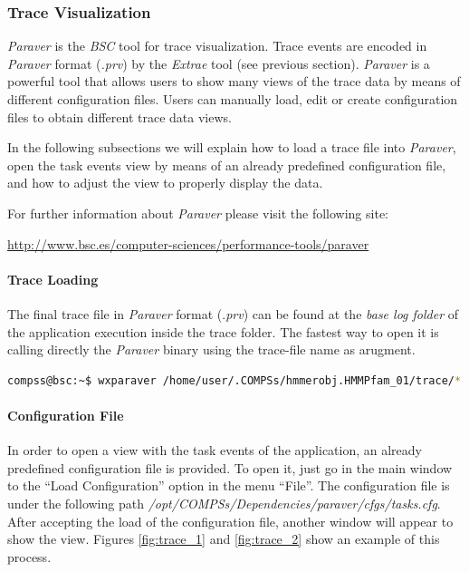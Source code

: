 \subsubsection{Trace Visualization}
\label{subsubsec:paraver}
\textit{Paraver} is the \textit{BSC} tool for trace visualization. Trace events are encoded in \textit{Paraver} format (\textit{.prv}) 
by the \textit{Extrae} tool (see previous section). \textit{Paraver} is a powerful tool that allows users to show many 
views of the trace data by means of different configuration files. Users can manually load, edit or create configuration files to
obtain different trace data views. 

In the following subsections we will explain how to load a trace file into \textit{Paraver}, open the task 
events view by means of an already predefined configuration file, and how to 
adjust the view to properly display the data.

For further information about \textit{Paraver} please visit the following site:
\begin{center}
\url{http://www.bsc.es/computer-sciences/performance-tools/paraver}
\end{center}

\paragraph{Trace Loading}
The final trace file in \textit{Paraver} format (.\textit{prv}) can be found at the \textit{base log folder} of the application
execution inside the trace folder. The fastest way to open it is calling directly the \textit{Paraver} binary using the trace-file name
as arugment.
\begin{lstlisting}[language=bash]
compss@bsc:~$ wxparaver /home/user/.COMPSs/hmmerobj.HMMPfam_01/trace/*.prv
\end{lstlisting}
 
\paragraph{Configuration File}
In order to open a view with the task events of the application, an already predefined configuration 
file is provided. To open it, just go in the main window to the ``Load Configuration'' option in 
the menu ``File''. The configuration file is under the following path \textit{/opt/COMPSs/Dependencies/paraver/cfgs/tasks.cfg}. 
After accepting the load of the configuration file, another window will appear to show the view. Figures \ref{fig:trace_1} and
\ref{fig:trace_2} show an example of this process.

